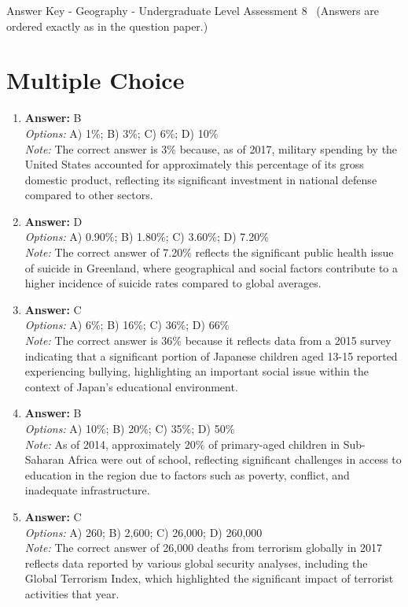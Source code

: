 \documentclass[12pt]{article}
\begin{document}
\begin{center}
Answer Key - Geography - Undergraduate Level Assessment 8 \
\small (Answers are ordered exactly as in the question paper.)
\end{center}

\section*{Multiple Choice}
\begin{enumerate}[label=\arabic*.]
\item \textbf{Answer:} B
\\ \textit{Options:} A) 1\%; B) 3\%; C) 6\%; D) 10\%
\\ \textit{Note:} The correct answer is 3\% because, as of 2017, military spending by the United States accounted for approximately this percentage of its gross domestic product, reflecting its significant investment in national defense compared to other sectors.
\item \textbf{Answer:} D
\\ \textit{Options:} A) 0.90\%; B) 1.80\%; C) 3.60\%; D) 7.20\%
\\ \textit{Note:} The correct answer of 7.20\% reflects the significant public health issue of suicide in Greenland, where geographical and social factors contribute to a higher incidence of suicide rates compared to global averages.
\item \textbf{Answer:} C
\\ \textit{Options:} A) 6\%; B) 16\%; C) 36\%; D) 66\%
\\ \textit{Note:} The correct answer is 36\% because it reflects data from a 2015 survey indicating that a significant portion of Japanese children aged 13-15 reported experiencing bullying, highlighting an important social issue within the context of Japan's educational environment.
\item \textbf{Answer:} B
\\ \textit{Options:} A) 10\%; B) 20\%; C) 35\%; D) 50\%
\\ \textit{Note:} As of 2014, approximately 20\% of primary-aged children in Sub-Saharan Africa were out of school, reflecting significant challenges in access to education in the region due to factors such as poverty, conflict, and inadequate infrastructure.
\item \textbf{Answer:} C
\\ \textit{Options:} A) 260; B) 2,600; C) 26,000; D) 260,000
\\ \textit{Note:} The correct answer of 26,000 deaths from terrorism globally in 2017 reflects data reported by various global security analyses, including the Global Terrorism Index, which highlighted the significant impact of terrorist activities that year.
\end{enumerate}
\end{document}
